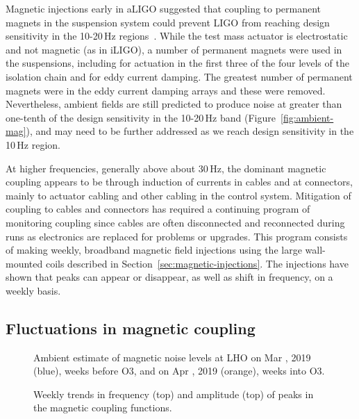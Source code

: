 Magnetic injections early in \ac{aLIGO} suggested that coupling to permanent magnets in the suspension system  could prevent \ac{LIGO} from reaching design sensitivity in the 10-20\,Hz regions~\citep{Schofield_2013}.
While the test mass actuator is electrostatic and not magnetic (as in \ac{iLIGO}), a number of permanent magnets were used in the suspensions, including for actuation in the first three of the four levels of the isolation chain and for eddy current damping.
The greatest number of permanent magnets were in the eddy current damping arrays and these were removed.
Nevertheless, ambient fields are still predicted to produce noise at greater than one-tenth of the design sensitivity in the 10-20\,Hz band (Figure~\ref{fig:ambient-mag}), and may need to be further addressed as we reach design sensitivity in the 10\,Hz region.

At higher frequencies, generally above about 30\,Hz, the dominant magnetic coupling appears to be through induction of currents in cables and at connectors, mainly to actuator cabling and other cabling in the control system.
Mitigation of coupling to cables and connectors has required a continuing program of monitoring coupling since cables are often disconnected and reconnected during runs as electronics are replaced for problems or upgrades.
This program consists of making weekly, broadband magnetic field injections using the large wall-mounted coils described in Section~\ref{sec:magnetic-injections}.
The injections have shown that peaks can appear or disappear, as well as shift in frequency, on a weekly basis.

\subsection{Fluctuations in magnetic coupling}\label{sec:noise-mag-weekly}

\begin{figure}
	\centering
	\caption{
		Ambient estimate of magnetic noise levels at LHO on Mar \XX, 2019 (blue), \XX weeks before O3, and on Apr \XX, 2019 (orange), \XX weeks into O3.}
	\label{fig:weekly-mag-preO3}
\end{figure}

\begin{figure}
	\centering
	\caption{Weekly trends in frequency (top) and amplitude (top) of peaks in the magnetic coupling functions.}
	\label{fig:weekly-mag-variation}
\end{figure}

